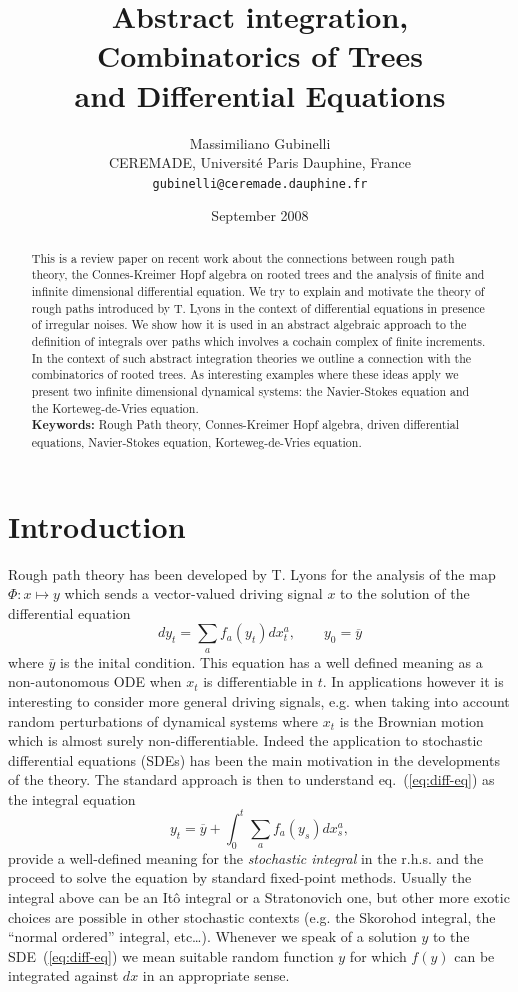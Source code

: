 \documentclass[a4paper]{article}
\title{Abstract integration, Combinatorics of Trees\\ and Differential Equations}
\author{Massimiliano Gubinelli\\[.4em]
{\small CEREMADE, Universit\'e Paris Dauphine, France}\\[-.2em]{\small  \texttt{gubinelli@ceremade.dauphine.fr}}}
\date{September 2008}
\newcommand{\1}{{\bf 1}}
\begin{document}
\maketitle
\begin{abstract}
This is a review paper on recent work about the connections between rough path theory, the Connes-Kreimer Hopf algebra on rooted trees and the analysis of finite and infinite dimensional differential equation. We try to explain and motivate the theory of rough paths introduced by T. Lyons in the context of differential equations in presence of irregular noises. We show how it is used  in an abstract algebraic approach to the definition of integrals  over paths which involves a cochain complex of finite increments. In the context of such abstract integration theories we outline a connection with the combinatorics of rooted trees.  As interesting examples where these ideas apply we present two infinite dimensional dynamical systems:  the Navier-Stokes equation and the Korteweg-de-Vries equation.
\\[.5cm]

\textbf{Keywords:} Rough Path theory, Connes-Kreimer Hopf algebra, driven differential equations, Navier-Stokes equation, Korteweg-de-Vries equation.
\end{abstract}

\section{Introduction}
\label{sec:intro}

Rough path theory has been developed by T. Lyons for the analysis
 of the map $\Phi : x \mapsto y$ which sends a vector-valued driving
signal $x$ to the solution of the differential equation
\begin{equation}
  \label{eq:diff-eq}
dy_t = \sum_a f_a(y_t) dx^a_t, \qquad y_0 = \overline y 
\end{equation}
where $\overline y$ is the inital condition. This
equation has a well defined meaning as a non-autonomous ODE when $x_t$ is differentiable in
$t$. In applications however it is interesting to consider more
general driving signals, e.g. when taking into account random
perturbations of dynamical systems where  $x_t$ is
the Brownian motion which is almost surely
non-differentiable. Indeed the application to stochastic differential
equations (SDEs) has been the main motivation in the developments of
the theory. The standard approach is then to understand
eq.~(\ref{eq:diff-eq}) as the integral equation
\begin{equation}
  \label{eq:ito-sde}
y_t = \overline{y} + \int_0^t \sum_a f_a(y_s) dx^a_s , 
\end{equation}
provide a well-defined meaning for the \emph{stochastic integral} in
the r.h.s. and the proceed to solve the equation by standard
fixed-point methods. Usually the integral above can be an It\^o
integral or a Stratonovich one, but other more exotic choices are
possible in other stochastic contexts (e.g. the Skorohod integral, the
``normal ordered'' integral, etc\dots). Whenever we speak of a solution $y$ to the
SDE~(\ref{eq:diff-eq}) we mean suitable random function $y$ for which
 $f(y)$ can be integrated against $dx$ in an appropriate
sense.
\end{document}
